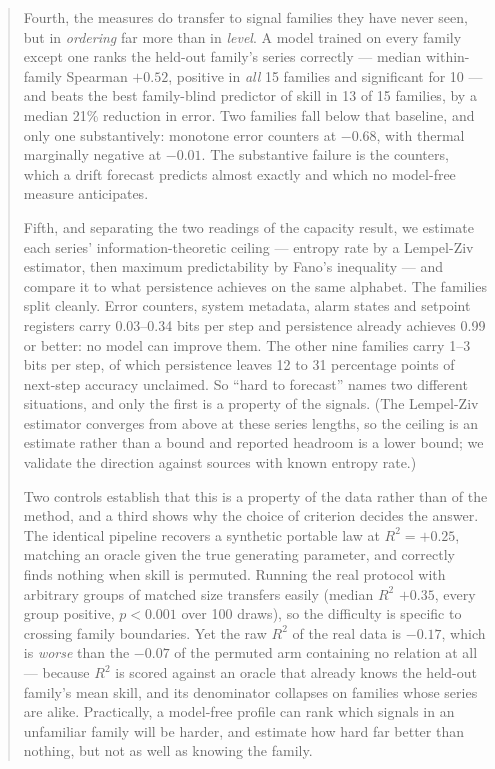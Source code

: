 \documentclass[11pt,a4paper]{article}
\newcommand{\num}[1]{#1}
\begin{document}
\begin{abstract}
Fourth, the measures do transfer to signal families they have never seen, but
in \emph{ordering} far more than in \emph{level}. A model trained on every
family except one ranks the held-out family's series correctly --- median
within-family Spearman \(+0.52\), positive in \emph{all} \num{15} families and
significant for \num{10} --- and beats the best family-blind
predictor of skill in \num{13} of \num{15} families, by a median \num{21}\%
reduction in error. Two families fall below that baseline, and only one
substantively: monotone error counters at \(-0.68\), with thermal marginally
negative at \(-0.01\). The substantive failure is the counters, which a drift
forecast predicts almost exactly and which no model-free measure anticipates.

Fifth, and separating the two readings of the capacity result, we estimate each
series' information-theoretic ceiling --- entropy rate by a Lempel-Ziv
estimator, then maximum predictability by Fano's inequality --- and compare it
to what persistence achieves on the same alphabet. The families split cleanly.
Error counters, system metadata, alarm states and setpoint registers carry
\num{0.03}--\num{0.34} bits per step and persistence already achieves \num{0.99}
or better: no model can improve them. The other nine families carry
\num{1}--\num{3} bits per step, of which persistence leaves \num{12} to \num{31}
percentage points of next-step accuracy unclaimed. So ``hard to forecast'' names
two different situations, and only the first is a property of the signals.
(The Lempel-Ziv estimator converges from above at these series lengths, so the
ceiling is an estimate rather than a bound and reported headroom is a lower
bound; we validate the direction against sources with known entropy rate.)

Two controls establish that this is a property of the data rather than of the
method, and a third shows why the choice of criterion decides the answer. The
identical pipeline recovers a synthetic portable law at \(R^2=+0.25\), matching
an oracle given the true generating parameter, and correctly finds nothing when
skill is permuted. Running the real protocol with arbitrary groups of matched
size transfers easily (median \(R^2\) \(+0.35\), every group positive,
\(p<0.001\) over \num{100} draws), so the difficulty is specific to crossing
family boundaries. Yet the raw \(R^2\) of the real data is \(-0.17\), which is
\emph{worse} than the \(-0.07\) of the permuted arm containing no relation at
all --- because \(R^2\) is scored against an oracle that already knows the
held-out family's mean skill, and its denominator collapses on families whose
series are alike. Practically, a model-free profile can rank which signals in an
unfamiliar family will be harder, and estimate how hard far better than nothing,
but not as well as knowing the family.
\end{abstract}
\end{document}
